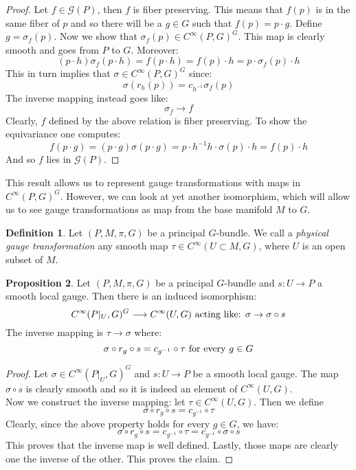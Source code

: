 \documentclass[12pt,a4paper]{report}
\theoremstyle{definition}
\newtheorem{Def}{Definition}[chapter]
\theoremstyle{Theorem}
\newtheorem{Prop}[Def]{Proposition}
\theoremstyle{definition}
\theoremstyle{definition}
\begin{document}
	\begin{proof}
		Let $f\in\mathcal{G}(P)$, then $f$ is fiber preserving. This means that $f(p)$ is in the same fiber of $p$ and so there will be a $g\in G$ such that $f(p)=p\cdot g$. Define $g=\sigma_f(p)$. Now we show that $\sigma_f(p)\in C^\infty(P,G)^G$. This map is clearly smooth and goes from $P$ to $G$. Moreover:
		$$(p\cdot h)\sigma_f(p\cdot h)=f(p\cdot h)=f(p)\cdot h=p\cdot \sigma_f(p)\cdot h$$
		This in turn implies that $\sigma\in C^\infty(P,G)^G$ since:
		$$\sigma(r_h(p))=c_{h^{-1}}\sigma_f(p)$$
		The inverse mapping instead goes like:
		$$\sigma_f\rightarrow f$$
		Clearly, $f$ defined by the above relation is fiber preserving. To show the equivariance one computes:
		$$f(p\cdot g)=(p\cdot g)\sigma(p\cdot g)=p\cdot h^{-1}h\cdot\sigma(p)\cdot h=f(p)\cdot h$$
		And so $f$ lies in $\mathcal{G}(P)$.
	\end{proof}
	This result allows us to represent gauge transformations with maps in $C^\infty(P,G)^G$. However, we can look at yet another isomorphism, which will allow us to see gauge transformations as map from the base manifold $M$ to $G$.
	\begin{Def}
		Let $(P,M,\pi,G)$ be a principal $G$-bundle. We call a \textit{physical gauge transformation} any smooth map $\tau\in C^\infty(U\subset M,G)$, where $U$ is an open subset of $M$.
	\end{Def} 
	\begin{Prop}\label{Prop_7.1.2}
		Let $(P,M,\pi,G)$ be a principal $G$-bundle and $s:U\rightarrow P$ a smooth local gauge. Then there is an induced isomorphism:
		$$C^\infty(P|_U,G)^G\longrightarrow C^\infty(U,G)\hbox{ acting like: }\sigma\rightarrow \sigma\circ s$$
		The inverse mapping is $\tau\rightarrow \sigma$ where: 
		$$\sigma\circ r_g\circ s=c_{g^{-1}}\circ\tau\hbox{ for every } g\in G$$
	\end{Prop}
	\begin{proof}
		Let $\sigma\in C^\infty(P|_U,G)^G$ and $s:U\rightarrow P$ be a smooth local gauge. The map $\sigma\circ s$ is clearly smooth and so it is indeed an element of $C^\infty(U,G)$.\\
		Now we construct the inverse mapping: let $\tau\in C^\infty(U,G)$. Then we define 
		$$\sigma\circ r_g\circ s=c_{g^{-1}}\circ\tau$$
		Clearly, since the above property holds for every $g\in G$, we have:
		$$\sigma\circ r_g\circ s=c_{g^{-1}}\circ \tau=c_{g^{-1}}\circ \sigma\circ s$$
		This proves that the inverse map is well defined. Lastly, those maps are clearly one the inverse of the other. This proves the claim.
	\end{proof}
\end{document}
